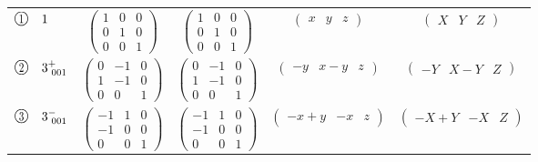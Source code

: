 \documentclass[fleqn,10pt,landscape]{jsarticle}
\begin{document}
\begin{center}
\begin{longtable}{lcccc}
$ {\ooalign{\hfil\resizebox{.8\width}{\height}{1}\hfil\crcr\raise.1ex\hbox{\large$\bigcirc$}}}\quad 1 $ & $ \begin{pmatrix} 1 & 0 & 0 \\ 0 & 1 & 0 \\ 0 & 0 & 1 \end{pmatrix} $ & $ \begin{pmatrix} 1 & 0 & 0 \\ 0 & 1 & 0 \\ 0 & 0 & 1 \end{pmatrix} $ & $ \begin{pmatrix} x & y & z \end{pmatrix} $ & $ \begin{pmatrix} X & Y & Z \end{pmatrix} $ \\
$ {\ooalign{\hfil\resizebox{.8\width}{\height}{2}\hfil\crcr\raise.1ex\hbox{\large$\bigcirc$}}}\quad 3^{+}_{\,\,001} $ & $ \begin{pmatrix} 0 & -1 & 0 \\ 1 & -1 & 0 \\ 0 & 0 & 1 \end{pmatrix} $ & $ \begin{pmatrix} 0 & -1 & 0 \\ 1 & -1 & 0 \\ 0 & 0 & 1 \end{pmatrix} $ & $ \begin{pmatrix} - y & x - y & z \end{pmatrix} $ & $ \begin{pmatrix} - Y & X - Y & Z \end{pmatrix} $ \\
$ {\ooalign{\hfil\resizebox{.8\width}{\height}{3}\hfil\crcr\raise.1ex\hbox{\large$\bigcirc$}}}\quad 3^{-}_{\,\,001} $ & $ \begin{pmatrix} -1 & 1 & 0 \\ -1 & 0 & 0 \\ 0 & 0 & 1 \end{pmatrix} $ & $ \begin{pmatrix} -1 & 1 & 0 \\ -1 & 0 & 0 \\ 0 & 0 & 1 \end{pmatrix} $ & $ \begin{pmatrix} - x + y & - x & z \end{pmatrix} $ & $ \begin{pmatrix} - X + Y & - X & Z \end{pmatrix} $ \\

\end{longtable}
\end{center}
\end{document}
